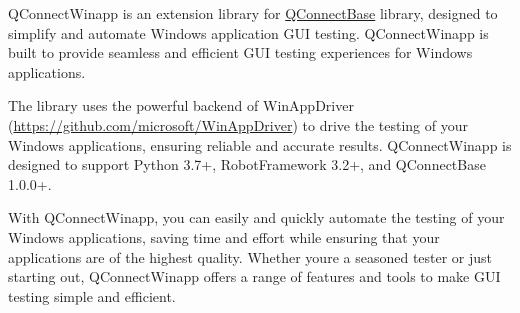 %
%

QConnectWinapp is an extension library for
\href{https://github.com/test-fullautomation/robotframework-qconnect-base/}{QConnectBase}
library, designed to simplify and automate Windows application GUI
testing. QConnectWinapp is built to provide seamless and efficient GUI
testing experiences for Windows applications.

The library uses the powerful backend of WinAppDriver
(\url{https://github.com/microsoft/WinAppDriver}) to drive the testing
of your Windows applications, ensuring reliable and accurate results.
QConnectWinapp is designed to support Python 3.7+, RobotFramework 3.2+,
and QConnectBase 1.0.0+.

With QConnectWinapp, you can easily and quickly automate the testing of
your Windows applications, saving time and effort while ensuring that
your applications are of the highest quality. Whether
you\textquotesingle re a seasoned tester or just starting out,
QConnectWinapp offers a range of features and tools to make GUI testing
simple and efficient.
